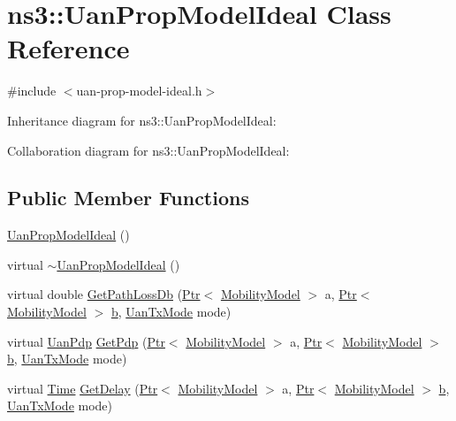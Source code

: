 \hypertarget{classns3_1_1UanPropModelIdeal}{}\section{ns3\+:\+:Uan\+Prop\+Model\+Ideal Class Reference}
\label{classns3_1_1UanPropModelIdeal}


{\ttfamily \#include $<$uan-\/prop-\/model-\/ideal.\+h$>$}



Inheritance diagram for ns3\+:\+:Uan\+Prop\+Model\+Ideal\+:


Collaboration diagram for ns3\+:\+:Uan\+Prop\+Model\+Ideal\+:
\subsection*{Public Member Functions}
\begin{DoxyCompactItemize}
\item 
\hyperlink{classns3_1_1UanPropModelIdeal_a2e22f8c271ea4153315c3dbca20b4a5a}{Uan\+Prop\+Model\+Ideal} ()
\item 
virtual \hyperlink{classns3_1_1UanPropModelIdeal_a8519a78a968e28f12d150693b413d316}{$\sim$\+Uan\+Prop\+Model\+Ideal} ()
\item 
virtual double \hyperlink{classns3_1_1UanPropModelIdeal_a5185603ba448d0d17dcf205c349e750a}{Get\+Path\+Loss\+Db} (\hyperlink{classns3_1_1Ptr}{Ptr}$<$ \hyperlink{classns3_1_1MobilityModel}{Mobility\+Model} $>$ a, \hyperlink{classns3_1_1Ptr}{Ptr}$<$ \hyperlink{classns3_1_1MobilityModel}{Mobility\+Model} $>$ \hyperlink{lte__pathloss_8m_a21ad0bd836b90d08f4cf640b4c298e7c}{b}, \hyperlink{classns3_1_1UanTxMode}{Uan\+Tx\+Mode} mode)
\item 
virtual \hyperlink{classns3_1_1UanPdp}{Uan\+Pdp} \hyperlink{classns3_1_1UanPropModelIdeal_af6aca3148a73f5b0f37139649cab200f}{Get\+Pdp} (\hyperlink{classns3_1_1Ptr}{Ptr}$<$ \hyperlink{classns3_1_1MobilityModel}{Mobility\+Model} $>$ a, \hyperlink{classns3_1_1Ptr}{Ptr}$<$ \hyperlink{classns3_1_1MobilityModel}{Mobility\+Model} $>$ \hyperlink{lte__pathloss_8m_a21ad0bd836b90d08f4cf640b4c298e7c}{b}, \hyperlink{classns3_1_1UanTxMode}{Uan\+Tx\+Mode} mode)
\item 
virtual \hyperlink{classns3_1_1Time}{Time} \hyperlink{classns3_1_1UanPropModelIdeal_a3aee9ee82d6cf798ce814f6e46d6dfd3}{Get\+Delay} (\hyperlink{classns3_1_1Ptr}{Ptr}$<$ \hyperlink{classns3_1_1MobilityModel}{Mobility\+Model} $>$ a, \hyperlink{classns3_1_1Ptr}{Ptr}$<$ \hyperlink{classns3_1_1MobilityModel}{Mobility\+Model} $>$ \hyperlink{lte__pathloss_8m_a21ad0bd836b90d08f4cf640b4c298e7c}{b}, \hyperlink{classns3_1_1UanTxMode}{Uan\+Tx\+Mode} mode)
\end{DoxyCompactItemize}

